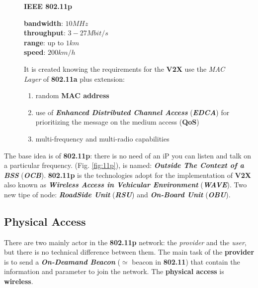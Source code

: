 \begin{figure}[h]
\begin{minipage}[t]{0.45\textwidth}
        \begin{flushleft}
            \textbf{IEEE 802.11p} \\
            \begin{boxA}
                \centering
                \textbf{bandwidth}: $10MHz$ \\
                \textbf{throughput}: $3-27Mbit/s$ \\
                \textbf{range}: up to $1km$ \\
                \textbf{speed}: $200km/h$
            \end{boxA}
            It is created knowing the requirements for the \textbf{V2X} use the \textit{MAC Layer} of \textbf{802.11a} plus extension:
            \begin{enumerate}[nosep]
                \item random \textbf{MAC address}
                \item use of \textbf{\textit{Enhanced Distributed Channel Access}} (\textbf{\textit{EDCA}}) for prioritizing the message on the medium access (\textbf{QoS})
                \item multi-frequency and multi-radio capabilities
            \end{enumerate}
        \end{flushleft}
    \end{minipage}
\end{figure}
The base idea is of \textbf{802.11p}: there is no need of an iP you can listen and talk on a particular frequency. (Fig. \ref{fig:11p}), is named: \textbf{\textit{Outside The Context of a BSS}} (\textbf{\textit{OCB}}). \textbf{802.11p} is the technologies adopt for the implementation of \textbf{V2X} also known as \textbf{\textit{Wireless Access in Vehicular Environment}} (\textbf{\textit{WAVE}}). Two new tipe of node: \textbf{\textit{RoadSide Unit}} (\textbf{\textit{RSU}}) and \textbf{\textit{On-Board Unit}} (\textbf{\textit{OBU}}).

\subsection{Physical Access}
There are two mainly actor in the \textbf{802.11p} network: the \textit{provider} and the \textit{user}, but there is no technical difference between them. The main task of the \textbf{provider} is to send a \textbf{\textit{On-Deamand Beacon}} ($\simeq$ beacon in \textbf{802.11}) that contain the information and parameter to join the network. The \textbf{physical access} is \textbf{wireless}.

